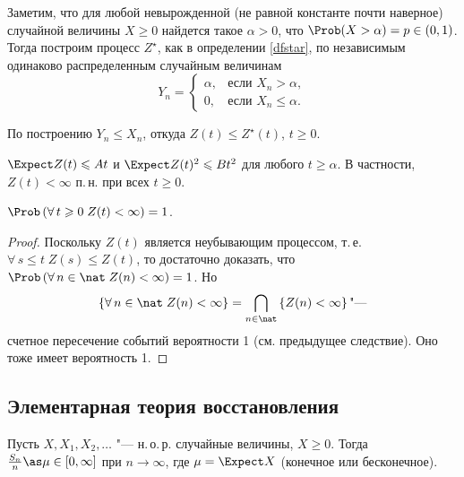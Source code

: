 Заметим, что для любой невырожденной (не равной константе почти наверное) случайной величины $X \geqslant 0$ найдется такое $\alpha > 0$, что $\Prob(X > \alpha) = p \in (0, 1)$. Тогда построим процесс $Z^\star$, как в определении \ref{dfstar}, по независимым одинаково распределенным случайным величинам
\begin{equation*}
  Y_n =
  \begin{cases}
    \alpha, &\text{если }X_n > \alpha,\\
    0, &\text{если }X_n \leqslant \alpha.
  \end{cases}
\end{equation*}

По построению $Y_n \leqslant X_n$, откуда $Z(t) \leqslant Z^\star(t)$, $t \geqslant 0$.

\begin{cor}
  $\Expect Z(t) \leqslant A t$ и $\Expect Z(t)^2 \leqslant B t^2$ для любого $t \geqslant \alpha$. В частности, $Z(t) < \infty$ п.\,н. при всех $t \geqslant 0$.
\end{cor}

\begin{cor}
  $\Prob\left( \forall\, t \geqslant 0\; Z(t) < \infty \right) = 1$.
\end{cor}

\begin{proof}
  Поскольку $Z(t)$ является неубывающим процессом, т.\,е. $\forall\, s \leqslant t \; Z(s) \leqslant Z(t)$, то достаточно доказать, что $\Prob\left(\forall\,n \in \nat\; Z(n) < \infty\right) = 1$. Но
  \begin{equation*}
    \left\{ \forall\,n \in \nat\; Z(n) < \infty \right\} = \bigcap_{n \in \nat} \left\{ Z(n) < \infty \right\} \text{"---}
  \end{equation*}
  счетное пересечение событий вероятности 1 (см. предыдущее следствие). Оно тоже имеет вероятность 1.
\end{proof}


\subsection{Элементарная теория восстановления}

\begin{lem}
  Пусть $X, X_1, X_2, \ldots$  "--- н.\,о.\,р. случайные величины, $X \geqslant 0$. Тогда $\frac{S_n}{n} \as \mu \in [0, \infty]$ при $n \to \infty$, где $\mu = \Expect X$ (конечное или бесконечное).
\end{lem}

